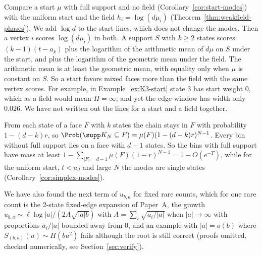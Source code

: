 \begin{remark}\label{rem:start-vs-field}
Compare a start $\mu$ with full support and no field
(Corollary~\ref{cor:start-modes}) with the uniform start and the field
$h_i=\log(d\mu_i)$ (Theorem~\ref{thm:weakfield-phases}). We add $\log d$ to the
start lines, which does not change the modes. Then a vertex $i$ scores
$\log(d\mu_i)$ in both. A support $S$ with $k\ge2$ states scores $(k-1)(t-a_k)$
plus the logarithm of the arithmetic mean of $d\mu$ on $S$ under the start, and
plus the logarithm of the geometric mean under the field. The arithmetic mean is
at least the geometric mean, with equality only when $\mu$ is constant on $S$.
So a start favors mixed faces more than the field with the same vertex scores.
For example, in Example~\ref{ex:K3-start} state $3$ has start weight $0$, which
as a field would mean $H=\infty$, and yet the edge window has width only
$0.026$. We have not written out the lines for a start and a field together.
\end{remark}

\begin{remark}\label{rem:mass-mode}
From each state of a face $F$ with $k$ states the chain stays in $F$ with
probability $1-(d-k)r$, so $\Prob(\supp K_N\subseteq F)=\mu(F)(1-(d-k)r)^{N-1}$.
Every bin without full support lies on a face with $d-1$ states. So the bins
with full support have mass at least
$1-\sum_{|F|=d-1}\mu(F)(1-r)^{N-1}=1-O(e^{-T})$, while for the uniform start,
$t<a_d$ and large $N$ the modes are single states
(Corollary~\ref{cor:simplex-modes}).
\end{remark}

We have also found the next term of $u_{b,a}$ for fixed rare counts, which
for one rare count is the 2-state fixed-edge expansion of Paper~A, the growth
$u_{b,a}\sim\ell\log|a|/(2A\sqrt{|a|b})$ with $A=\sum_i\sqrt{a_i/|a|}$ when
$|a|\to\infty$ with proportions $a_i/|a|$ bounded away from $0$, and an example
with $|a|=o(b)$ where $S_{(b,a)}(u)\sim H(bu^2)$ fails although the root is
still correct (proofs omitted, checked numerically, see
Section~\ref{sec:verify}).

